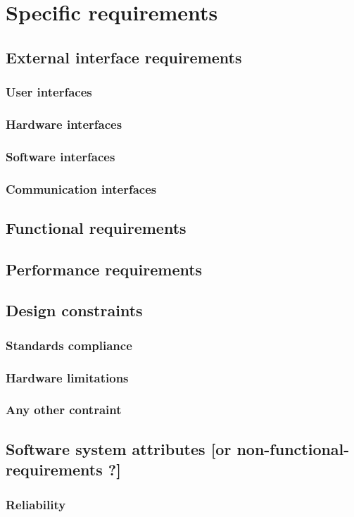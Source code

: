 \section{Specific requirements}
\subsection{External interface requirements}
\subsubsection{User interfaces}
\subsubsection{Hardware interfaces}
\subsubsection{Software interfaces}
\subsubsection{Communication interfaces}
\subsection{Functional requirements}
\subsection{Performance requirements}
\subsection{Design constraints}
\subsubsection{Standards compliance}
\subsubsection{Hardware limitations}
\subsubsection{Any other contraint}
\subsection{Software system attributes [or non-functional-requirements ?]}
\subsubsection{Reliability}
